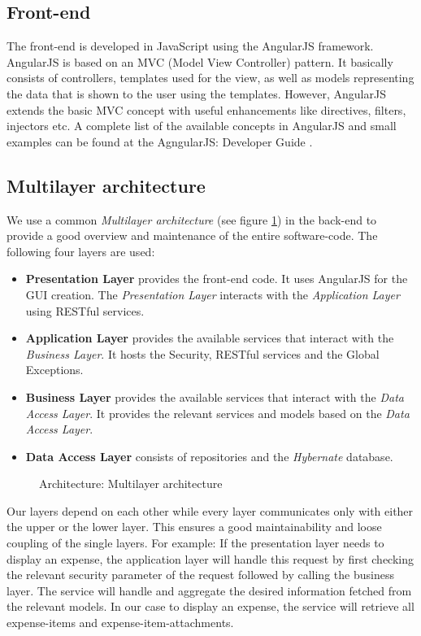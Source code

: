 \subsection{Front-end}
The front-end is developed in JavaScript using the AngularJS \cite{angular} framework. AngularJS is based on an MVC (Model View Controller) pattern. It basically consists of controllers, templates used for the view, as well as models representing the data that is shown to the user using the templates. However, AngularJS \cite{angular} extends the basic MVC concept with useful enhancements like directives, filters, injectors etc. A complete list of the available concepts in AngularJS and small examples can be found at the AgngularJS: Developer Guide \cite{angular-devguide}.   

\subsection{Multilayer architecture}
We use a common \textit{Multilayer architecture} (see figure \ref{fig:architecture-layer}) in the back-end to provide a good overview and maintenance of the entire software-code. The following four layers are used:
\begin{itemize}
    \item \textbf{Presentation Layer} provides the front-end code. It uses AngularJS for the GUI creation. The \textit{Presentation Layer} interacts with the \textit{Application Layer} using RESTful services.
    \item \textbf{Application Layer} provides the available services that interact with the \textit{Business Layer}. It hosts the Security, RESTful services and the Global Exceptions.
    \item \textbf{Business Layer} provides the available services that interact with the \textit{Data Access Layer}. It provides the relevant services and models based on the \textit{Data Access Layer}.
    \item \textbf{Data Access Layer} consists of repositories and the \textit{Hybernate} database. 
\end{itemize}

\begin{figure}[H]
    \centering
    \caption{Architecture: Multilayer architecture}
    \label{fig:architecture-layer}
\end{figure}

Our layers depend on each other while every layer communicates only with either the upper or the lower layer. This ensures a good maintainability and loose coupling of the single layers.\newline 
For example: If the presentation layer needs to display an expense, the application layer will handle this request by first checking the relevant security parameter of the request followed by calling the business layer. The service will handle and aggregate the desired information fetched from the relevant models. In our case to display an expense, the service will retrieve all expense-items and expense-item-attachments.


